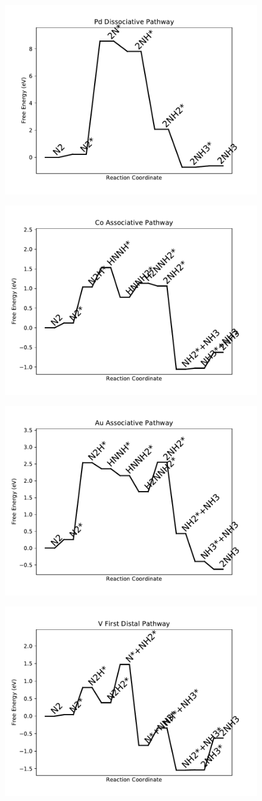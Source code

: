 \begin{figure}
\includegraphics[width=0.5\linewidth]{data/plots/Pd_dissociative.pdf}
\label{fig:Pd_dissociative}
\end{figure}

\begin{figure}
\includegraphics[width=0.5\linewidth]{data/plots/Co_associative.pdf}
\label{fig:Co_associative}
\end{figure}

\begin{figure}
\includegraphics[width=0.5\linewidth]{data/plots/Au_associative.pdf}
\label{fig:Au_associative}
\end{figure}

\begin{figure}
\includegraphics[width=0.5\linewidth]{data/plots/V_distal_1.pdf}
\label{fig:V_distal_1}
\end{figure}

